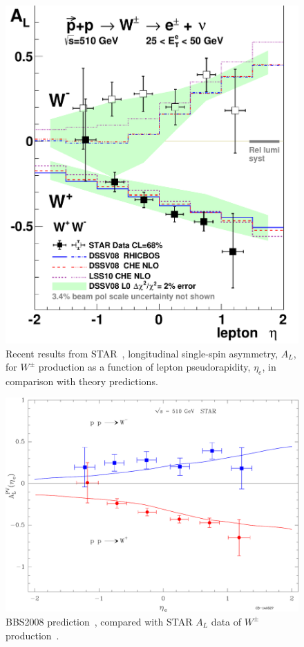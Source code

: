 \begin{figure} [htbp]
  \centering
    \includegraphics[width=0.60\linewidth]{figs_xj/STAR-WAL_2012.pdf}
  \caption{\label{fig:STAR_W} Recent results from STAR~\cite{Adamczyk:2014xyw},  longitudinal single-spin asymmetry, $A_L$, for $W^\pm$ production as a function of lepton pseudorapidity, $\eta_e$, in comparison with theory predictions. 
 }
\end{figure}

\begin{figure} [htbp]
  \centering
    \includegraphics[width=0.70\linewidth]{figs_xj/BBS2008_STARW_submitted.pdf} 
  \caption{\label{fig:STAR_WBBS2008} BBS2008 prediction~\cite{Bourrely2013296}, compared with STAR  $A_L$ data of $W^\pm$ production~\cite{Adamczyk:2014xyw}. }
\end{figure}

